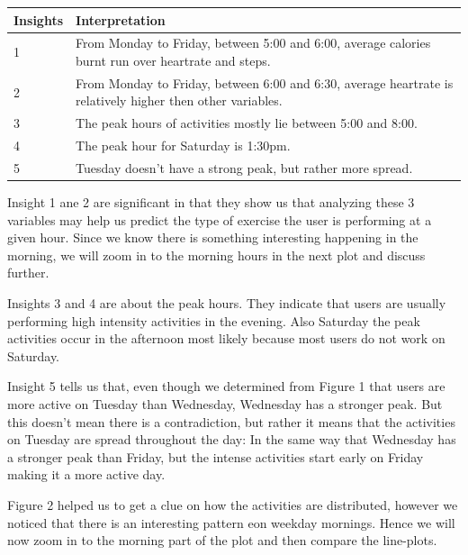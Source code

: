 \documentclass[
]{article}
\begin{document}
\begin{table}
\centering\begingroup\fontsize{14}{16}\selectfont

\begin{tabular}[t]{l|l}
\hline
Insights & Interpretation\\
\hline
1 & From Monday to Friday,  between 5:00 and 6:00, average calories burnt run over heartrate and steps.\\
\hline
2 & From Monday to Friday,  between 6:00 and 6:30, average heartrate is relatively higher then other variables.\\
\hline
3 & The peak hours of activities mostly lie between 5:00 and 8:00.\\
\hline
4 & The peak hour for Saturday is 1:30pm.\\
\hline
5 & Tuesday doesn't have a strong peak, but rather more spread.\\
\hline
\end{tabular}
\endgroup{}
\end{table}

Insight 1 ane 2 are significant in that they show us that analyzing
these 3 variables may help us predict the type of exercise the user is
performing at a given hour. Since we know there is something interesting
happening in the morning, we will zoom in to the morning hours in the
next plot and discuss further.

Insights 3 and 4 are about the peak hours. They indicate that users are
usually performing high intensity activities in the evening. Also
Saturday the peak activities occur in the afternoon most likely because
most users do not work on Saturday.

Insight 5 tells us that, even though we determined from Figure 1 that
users are more active on Tuesday than Wednesday, Wednesday has a
stronger peak. But this doesn't mean there is a contradiction, but
rather it means that the activities on Tuesday are spread throughout the
day: In the same way that Wednesday has a stronger peak than Friday, but
the intense activities start early on Friday making it a more active
day.

Figure 2 helped us to get a clue on how the activities are distributed,
however we noticed that there is an interesting pattern eon weekday
mornings. Hence we will now zoom in to the morning part of the plot and
then compare the line-plots.
\end{document}
